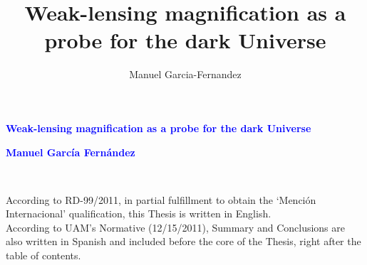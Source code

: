 \documentclass[12pt]{book} %
\begin{document}
\centering
\vspace*{5cm}
\par\normalfont\fontsize{27}{27}\sffamily\selectfont
\textcolor{blue}{\textbf{Weak-lensing magnification as a probe for the dark Universe}}\par %
\vspace*{1cm}
\textcolor{blue}{\textbf{\Huge Manuel Garc\'ia Fern\'andez}}\par %

\title{Weak-lensing magnification as a probe for the dark Universe}
\author{Manuel Garcia-Fernandez}
\endgroup


\newpage
~\vfill
\thispagestyle{empty}



\newpage
\noindent
According to RD-99/2011, in partial fulfillment to obtain the `Menci\'on Internacional' qualification, this Thesis is written in English.\\
According to UAM's Normative (12/15/2011), Summary and Conclusions are also written in Spanish and included before the core of the Thesis, right after the table of contents.\\
\end{document}
